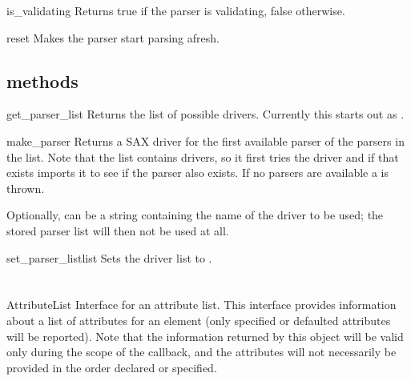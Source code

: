 \documentclass{howto}
\begin{document}
\begin{methoddesc}{is_validating}{}
Returns true if the parser is validating, false otherwise.
\end{methoddesc}

\begin{methoddesc}{reset}{}
Makes the parser start parsing afresh.
\end{methoddesc}

\subsection{ methods}

\begin{methoddesc}{get_parser_list}{}
Returns the list of possible drivers.  Currently this starts out as
.
\end{methoddesc}

\begin{methoddesc}{make_parser}{}
Returns a SAX driver for the first available parser of the parsers
in the list. Note that the list contains drivers, so it first tries
the driver and if that exists imports it to see if the parser also
exists. If no parsers are available a  is thrown.

Optionally,  can be a string containing the name of
the driver to be used; the stored parser list will then not be used at
all.  
\end{methoddesc}

\begin{methoddesc}{set_parser_list}{list}
Sets the driver list to .
\end{methoddesc}


\section{}

\begin{classdesc}{AttributeList}{}
Interface for an attribute list. This interface provides
    information about a list of attributes for an element (only
    specified or defaulted attributes will be reported). Note that the
    information returned by this object will be valid only during the
    scope of the  callback, and the
    attributes will not necessarily be provided in the order declared
    or specified.
\end{classdesc}
\end{document}
